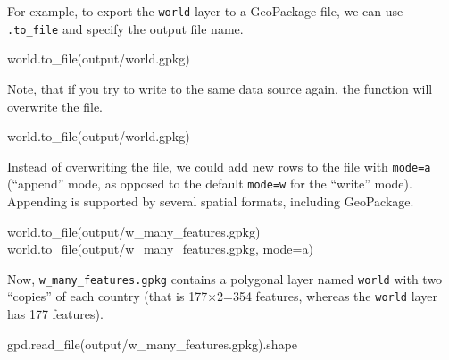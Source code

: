 \documentclass[
  letterpaper,
]{krantz}
\newenvironment{Shaded}{\begin{snugshade}}{\end{snugshade}}
\newcommand{\NormalTok}[1]{\textcolor[rgb]{0.00,0.23,0.31}{#1}}
\newcommand{\OperatorTok}[1]{\textcolor[rgb]{0.37,0.37,0.37}{#1}}
\newcommand{\StringTok}[1]{\textcolor[rgb]{0.13,0.47,0.30}{#1}}
\begin{document}
For example, to export the \texttt{world} layer to a GeoPackage file, we
can use \texttt{.to\_file} and specify the output file name.

\begin{Shaded}
\begin{Highlighting}[]
\NormalTok{world.to\_file(}\StringTok{\textquotesingle{}output/world.gpkg\textquotesingle{}}\NormalTok{)}
\end{Highlighting}
\end{Shaded}

Note, that if you try to write to the same data source again, the
function will overwrite the file.

\begin{Shaded}
\begin{Highlighting}[]
\NormalTok{world.to\_file(}\StringTok{\textquotesingle{}output/world.gpkg\textquotesingle{}}\NormalTok{)}
\end{Highlighting}
\end{Shaded}

Instead of overwriting the file, we could add new rows to the file with
\texttt{mode=\textquotesingle{}a\textquotesingle{}} (``append'' mode, as
opposed to the default
\texttt{mode=\textquotesingle{}w\textquotesingle{}} for the ``write''
mode). Appending is supported by several spatial formats, including
GeoPackage.

\begin{Shaded}
\begin{Highlighting}[]
\NormalTok{world.to\_file(}\StringTok{\textquotesingle{}output/w\_many\_features.gpkg\textquotesingle{}}\NormalTok{)}
\NormalTok{world.to\_file(}\StringTok{\textquotesingle{}output/w\_many\_features.gpkg\textquotesingle{}}\NormalTok{, mode}\OperatorTok{=}\StringTok{\textquotesingle{}a\textquotesingle{}}\NormalTok{)}
\end{Highlighting}
\end{Shaded}

Now, \texttt{w\_many\_features.gpkg} contains a polygonal layer named
\texttt{world} with two ``copies'' of each country (that is 177×2=354
features, whereas the \texttt{world} layer has 177 features).

\begin{Shaded}
\begin{Highlighting}[]
\NormalTok{gpd.read\_file(}\StringTok{\textquotesingle{}output/w\_many\_features.gpkg\textquotesingle{}}\NormalTok{).shape}
\end{Highlighting}
\end{Shaded}
\end{document}
